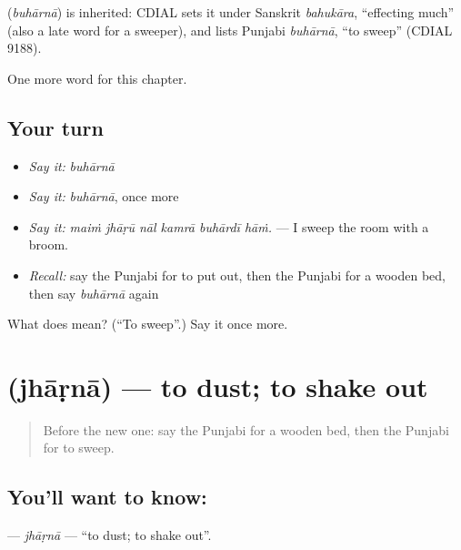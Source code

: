 \begin{cousinweb}
\textbf{} (\emph{buhārnā}) is inherited: CDIAL sets it under Sanskrit \emph{bahukāra}, \textquotedblleft{}effecting much\textquotedblright{} (also a late word for a sweeper), and lists Punjabi \emph{buhārnā}, \textquotedblleft{}to sweep\textquotedblright{} (CDIAL 9188).
\end{cousinweb}

\begin{grammarlens}[title={What you've built}]
One more word for this chapter.
\end{grammarlens}

\subsection*{Your turn}
\begin{itemize}
\raggedright
  \item \emph{Say it:} \emph{buhārnā}
  \item \emph{Say it:} \emph{buhārnā}, once more
  \item \emph{Say it:} \emph{maiṁ jhāṛū nāl kamrā buhārdī hāṁ.} — I sweep the room with a broom.
  \item \emph{Recall:} say the Punjabi for to put out, then the Punjabi for a wooden bed, then say \emph{buhārnā} again
\end{itemize}

\begin{tcolorbox}[breakable,colback=teal!4,colframe=teal!35!black,title={Before you move on}]
What does  mean? (\textquotedblleft{}To sweep\textquotedblright{}.) Say it once more.
\end{tcolorbox}
\section[\texorpdfstring{\pa{ਝਾੜਨਾ} (jhāṛnā)}{ਝਾੜਨਾ (jhāṛnā)}]{ (jhāṛnā) — to dust; to shake out}

\label{lesson:PA-C235-jharna}



\begin{quote}
Before the new one: say the Punjabi for a wooden bed, then the Punjabi for to sweep.
\end{quote}

\subsection*{You'll want to know: }
\textbf{} — \emph{jhāṛnā} — \textquotedblleft{}to dust; to shake out\textquotedblright{}.

